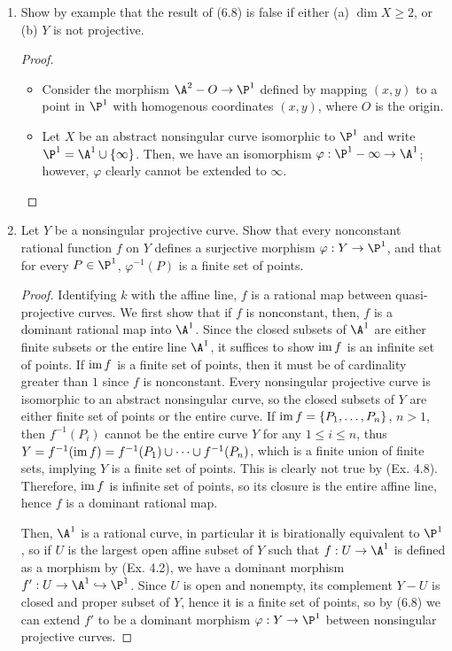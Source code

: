\documentclass[a4paper]{article}
\begin{document}
\begin{enumerate} [label=\textbf{\arabic*.}, leftmargin=0cm]
\item[\textbf{3.}] Show by example that the result of (6.8) is false if either (a) $\dim{X} \geq 2$, or (b) $Y$ is not projective.

\begin{proof} $ $ \vspace{0pt}
  \begin{itemize} [leftmargin=0cm]
    \item[(a)] Consider the morphism $\A^2 - O \to \P^1$ defined by mapping $(x, y)$ to a point in $\P^1$ with homogenous coordinates $(x, y)$, where $O$ is the origin.

    \item[(b)] Let $X$ be an abstract nonsingular curve isomorphic to $\P^1$ and write $\P^1 = \A^1 \cup \{ \infty \}$.
    Then, we have an isomorphism $\varphi : \P^1 - \infty \to \A^1$; however, $\varphi$ clearly cannot be extended to $\infty$.
  \end{itemize}
\end{proof}
\filbreak

\item[\textbf{4.}] Let $Y$ be a nonsingular projective curve. Show that every nonconstant rational function $f$ on $Y$ defines a surjective morphism $\varphi : Y \to \P^1$, and that for every $P \in \P^1$, $\varphi^{-1}(P)$ is a finite set of points.

\begin{proof}
  Identifying $k$ with the affine line, $f$ is a rational map between quasi-projective curves.
  We first show that if $f$ is nonconstant, then, $f$ is a dominant rational map into $\A^1$.
  Since the closed subsets of $\A^1$ are either finite subsets or the entire line $\A^1$, it suffices to show $\operatorname{im}{f}$ is an infinite set of points.
  If $\operatorname{im}{f}$ is a finite set of points, then it must be of cardinality greater than $1$ since $f$ is nonconstant.
  Every nonsingular projective curve is isomorphic to an abstract nonsingular curve, so the closed subsets of $Y$ are either finite set of points or the entire curve.
  If $\operatorname{im}{f} = \{ P_1, \dots, P_n \}$, $n > 1$, then $f^{-1}(P_i)$ cannot be the entire curve $Y$ for any $1 \leq i \leq n$, thus $Y = f^{-1}(\operatorname{im}{f}) = f^{-1}(P_1) \cup \dots \cup f^{-1}(P_n)$, which is a finite union of finite sets, implying $Y$ is a finite set of points. This is clearly not true by (Ex. 4.8).
  Therefore, $\operatorname{im}{f}$ is infinite set of points, so its closure is the entire affine line, hence $f$ is a dominant rational map.

  Then, $\A^1$ is a rational curve, in particular it is birationally equivalent to $\P^1$, so if $U$ is the largest open affine subset of $Y$ such that $f : U \to \A^1$ is defined as a morphism by (Ex. 4.2), we have a dominant morphism $f' : U \to \A^1 \hookrightarrow \P^1$.
  Since $U$ is open and nonempty, its complement $Y - U$ is closed and proper subset of $Y$, hence it is a finite set of points, so by (6.8) we can extend $f'$ to be a dominant morphism $\varphi: Y \to \P^1$ between nonsingular projective curves.
  

\end{proof}
\end{enumerate}
\end{document}

